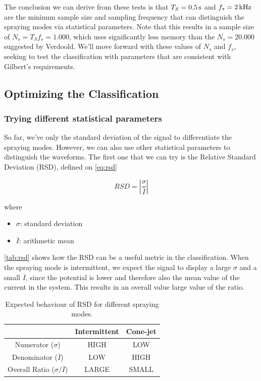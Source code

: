 \documentclass[oneside,12pt]{article}
\begin{document}
The conclusion we can derive from these tests is that $T_S = 0.5 \,\mathrm{s}$ and $f_s = 2 \,\mathrm{kHz}$ are the mininum sample size and sampling frequency that
can distinguish the spraying modes via statistical parameters. Note that this results in a sample size of $N_s = T_S f_s = 1.000$, which uses 
significantly less memory than the $N_s = 20.000$ suggested by Verdoold. We'll move forward with these values of $N_s$ and $f_s$, seeking to test the classification
with parameters that are consistent with Gilbert's requirements.

\subsection{Optimizing the Classification}

\subsubsection{Trying different statistical parameters}

So far, we've only the standard deviation of the signal to differentiate the spraying modes. However, we can also use other statistical parameters 
to distinguish the waveforms. The first one that we can try is the Relative Standard Deviation (RSD), defined on \autoref{eq:rsd}


\begin{equation} \label{eq:rsd}
    RSD = \left|\frac{\sigma}{\overline{I}}\right|
\end{equation}

where

\begin{itemize}
    \item $\sigma$: standard deviation
    \item $\overline{I}$: arithmetic mean
\end{itemize}

\autoref{tab:rsd} shows how the RSD can be a useful metric in the classification. When the spraying mode is intermittent, we 
expect the signal to display a large $\sigma$ and a small $\overline{I}$, since the potential is lower and therefore also the mean value 
of the current in the system. This results in an overall value large value of the ratio. 

\begin{table}[h!]
    \begin{center}
      \caption{Expected behaviour of RSD for different spraying modes.}
      \label{tab:rsd}
      \begin{tabular}{c|c|c}
        \textbf{} & \textbf{Intermittent} & \textbf{Cone-jet}\\
        \hline
        Numerator ($\sigma$) & HIGH & LOW\\
        Denominator ($\overline{I}$) & LOW& HIGH\\
        Overall Ratio ($\sigma / \overline{I}$) & LARGE & SMALL\\
      \end{tabular}
    \end{center}
  \end{table}
\end{document}
